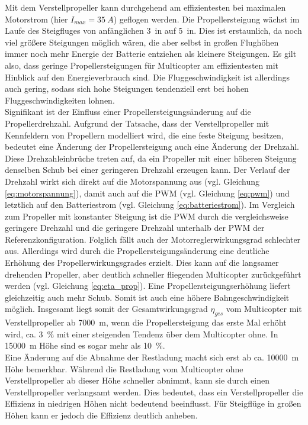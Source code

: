 Mit dem Verstellpropeller kann durchgehend am effizientesten bei maximalen Motorstrom (hier \ensuremath{I_{max} = \SI{35}{A}}) geflogen werden. Die Propellersteigung wächst im Laufe des Steigfluges von anfänglichen \SI{3}{in} auf \SI{5}{in}. Dies ist erstaunlich, da noch viel größere Steigungen möglich wären, die aber selbst in großen Flughöhen immer noch mehr Energie der Batterie entziehen als kleinere Steigungen. Es gilt also, dass geringe Propellersteigungen für Multicopter am effizientesten mit Hinblick auf den Energieverbrauch sind. Die Fluggeschwindigkeit ist allerdings auch gering, sodass sich hohe Steigungen tendenziell erst bei hohen Fluggeschwindigkeiten lohnen. \\
Signifikant ist der Einfluss einer Propellersteigungsänderung auf die Propellerdrehzahl. Aufgrund der Tatsache, dass der Verstellpropeller mit Kennfeldern von Propellern modelliert wird, die eine feste Steigung besitzen, bedeutet eine Änderung der Propellersteigung auch eine Änderung der Drehzahl. Diese Drehzahleinbrüche treten auf, da ein Propeller mit einer höheren Steigung denselben Schub bei einer geringeren Drehzahl erzeugen kann. Der Verlauf der Drehzahl wirkt sich direkt auf die Motorspannung aus (vgl. Gleichung \eqref{eq:motorspannung}), damit auch auf die PWM (vgl. Gleichung \eqref{eq:pwm}) und letztlich auf den Batteriestrom (vgl. Gleichung \eqref{eq:batteriestrom}). Im Vergleich zum Propeller mit konstanter Steigung ist die PWM durch die vergleichsweise geringere Drehzahl und die geringere Drehzahl unterhalb der PWM der Referenzkonfiguration. Folglich fällt auch der Motorreglerwirkungsgrad schlechter aus. Allerdings wird durch die Propellersteigungsänderung eine deutliche Erhöhung des Propellerwirkungsgrades erzielt. Dies kann auf die langsamer drehenden Propeller, aber deutlich schneller fliegenden Multicopter zurückgeführt werden (vgl. Gleichung \eqref{eq:eta_prop}). Eine Propellersteigungserhöhung liefert gleichzeitig auch mehr Schub. Somit ist auch eine höhere Bahngeschwindigkeit möglich. Insgesamt liegt somit der Gesamtwirkungsgrad \ensuremath{\eta_{ges}} vom Multicopter mit Verstellpropeller ab \SI{7000}{m}, wenn die Propellersteigung das erste Mal erhöht wird, ca. \SI{3}{\%} mit einer steigenden Tendenz über dem Multicopter ohne. In \SI{15000}{m} Höhe sind es sogar mehr als \SI{10}{\%}. \\
Eine Änderung auf die Abnahme der Restladung macht sich erst ab ca. \SI{10000}{m} Höhe bemerkbar. Während die Restladung vom Multicopter ohne Verstellpropeller ab dieser Höhe schneller abnimmt, kann sie durch einen Verstellpropeller verlangsamt werden. Dies bedeutet, dass ein Verstellpropeller die Effizienz in niedrigen Höhen nicht bedeutend beeinflusst. Für Steigflüge in großen Höhen kann er jedoch die Effizienz deutlich anheben.
